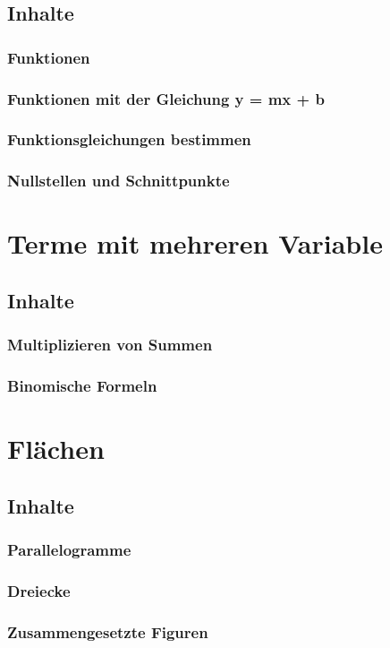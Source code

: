 \documentclass{article}
\begin{document}
\subsection{Inhalte}
\subsubsection*{Funktionen}
\subsubsection*{Funktionen mit der Gleichung y = mx + b}
\subsubsection*{Funktionsgleichungen bestimmen}
\subsubsection*{Nullstellen und Schnittpunkte}
\newpage
\section{Terme mit mehreren Variable}
\subsection{Inhalte}
\subsubsection*{Multiplizieren von Summen}
\subsubsection*{Binomische Formeln}
\newpage
\section{Flächen}
\subsection{Inhalte}
\subsubsection*{Parallelogramme}
\subsubsection*{Dreiecke}
\subsubsection*{Zusammengesetzte Figuren}
\newpage
\end{document}
